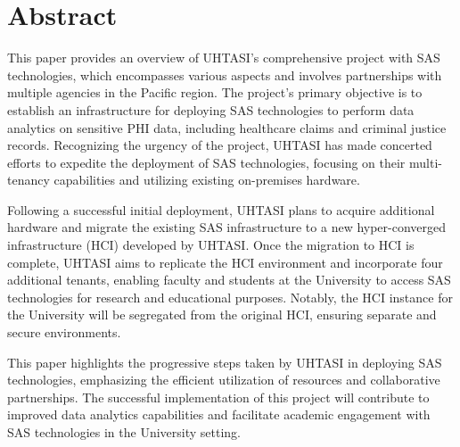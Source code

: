 \section*{Abstract}

This paper provides an overview of UHTASI's comprehensive project with SAS technologies, which encompasses various aspects and involves partnerships with multiple agencies in the Pacific region. The project's primary objective is to establish an infrastructure for deploying SAS technologies to perform data analytics on sensitive PHI data, including healthcare claims and criminal justice records. Recognizing the urgency of the project, UHTASI has made concerted efforts to expedite the deployment of SAS technologies, focusing on their multi-tenancy capabilities and utilizing existing on-premises hardware.

Following a successful initial deployment, UHTASI plans to acquire additional hardware and migrate the existing SAS infrastructure to a new hyper-converged infrastructure (HCI) developed by UHTASI. Once the migration to HCI is complete, UHTASI aims to replicate the HCI environment and incorporate four additional tenants, enabling faculty and students at the University to access SAS technologies for research and educational purposes. Notably, the HCI instance for the University will be segregated from the original HCI, ensuring separate and secure environments.

This paper highlights the progressive steps taken by UHTASI in deploying SAS technologies, emphasizing the efficient utilization of resources and collaborative partnerships. The successful implementation of this project will contribute to improved data analytics capabilities and facilitate academic engagement with SAS technologies in the University setting.